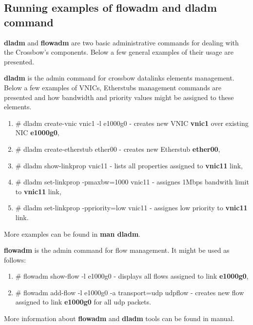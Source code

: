 \documentclass[11pt]{book}
\begin{document}
      \subsection{Running examples of flowadm and dladm command}

        \textbf{dladm} and \textbf{flowadm} are two basic administrative commands for dealing with the Crossbow's
        components. Below a few general examples of their usage are presented.
  
        \textbf{dladm} is the admin command for crossbow datalinks elements management. Below a few examples of VNICs,
        Etherstubs management commands are presented and how bandwidth and priority values might be assigned to these
        elements.
  
        \begin{enumerate}
          \item \# dladm create-vnic vnic1 -l e1000g0 - creates new VNIC \textbf{vnic1} over existing NIC \textbf{e1000g0},
          \item \# dladm create-etherstub ether00 - creates new Etherstub \textbf{ether00},
          \item \# dladm show-linkprop vnic11 - lists all properties assigned to \textbf{vnic11} link,
          \item \# dladm set-linkprop -pmaxbw=1000 vnic11 - assignes 1Mbps bandwith limit to \textbf{vnic11} link,
          \item \# dladm set-linkprop -ppriority=low vnic11 - assignes low priority to \textbf{vnic11} link.
        \end{enumerate}
  
        More examples can be found in \textbf{man dladm}.

        \medskip

        \textbf{flowadm} is the admin command for flow management. It might be used as follows:     

        \begin{enumerate}
          \item \# flowadm show-flow -l e1000g0 - displays all flows assigned to link \textbf{e1000g0},
          \item \# flowadm add-flow -l e1000g0 -a transport=udp udpflow - creates new flow assigned to link
                \textbf{e1000g0} for all udp packets.
        \end{enumerate}

        More information about \textbf{flowadm} and \textbf{dladm} tools can be found in manual.
\end{document}
